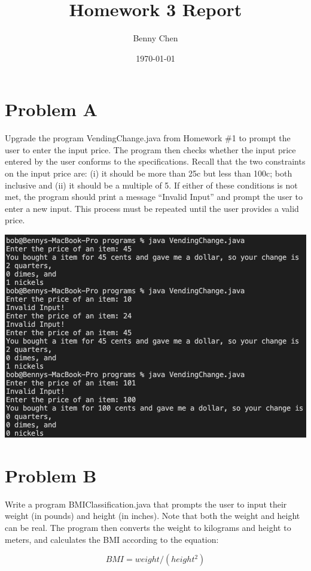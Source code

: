 \documentclass{article}
\title{Homework 3 Report}
\author{Benny Chen}
\date{\today}
\begin{document}
\maketitle

\section*{Problem A}
Upgrade the program VendingChange.java from Homework \#1 to prompt the user to enter the input price. The program then checks whether the input price entered by the user conforms to the specifications. Recall that the two constraints on the input price are: (i) it should be more than 25c but less than 100c; both inclusive and (ii) it should be a multiple of 5. If either of these conditions is not met, the program should print a message “Invalid Input” and prompt the user to enter a new input. This process must be repeated until the user provides a valid price.

\begin{center}
\includegraphics[width=\textwidth]{./images/vending.png}
\end{center}

\section*{Problem B}
Write a program BMIClassification.java that prompts the user to input their weight (in pounds) and height (in inches). Note that both the weight and height can be real. The program then converts the weight to kilograms and height to meters, and calculates the BMI according to the equation:

\[BMI = weight/(height^2)\]
\end{document}
